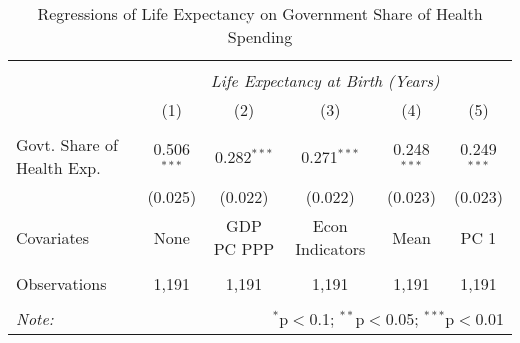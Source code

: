 \begin{table}[!htbp] \centering
  \caption{Regressions of Life Expectancy on Government Share of Health Spending \label{main_regs}}
\begin{tabular}{@{\extracolsep{5pt}}lccccc}
\\[-1.8ex]\hline
\hline \\[-1.8ex]
& \multicolumn{5}{c}{\textit{Life Expectancy at Birth (Years)}} \
\cr \
\\[-1.8ex] & (1) & (2) & (3) & (4) & (5) \\
\hline \\[-1.8ex]
 Govt. Share of Health Exp. & 0.506$^{***}$ & 0.282$^{***}$ & 0.271$^{***}$ & 0.248$^{***}$ & 0.249$^{***}$ \\
  & (0.025) & (0.022) & (0.022) & (0.023) & (0.023) \\
 Covariates & None & GDP PC PPP & Econ Indicators & Mean & PC 1 \\
\hline \\[-1.8ex]
 Observations & 1,191 & 1,191 & 1,191 & 1,191 & 1,191 \\
\hline
\hline \\[-1.8ex]
\textit{Note:} & \multicolumn{5}{r}{$^{*}$p$<$0.1; $^{**}$p$<$0.05; $^{***}$p$<$0.01} \\
\end{tabular}
\end{table}